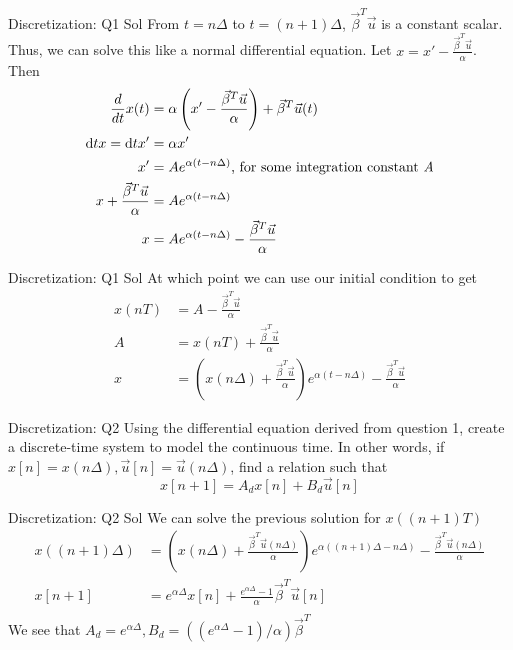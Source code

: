 \documentclass{beamer}
\begin{document}
\begin{frame}{Discretization: Q1 Sol}
From $t = n \Delta$ to $t = (n + 1) \Delta$, $\vec{\beta}^T \vec{u}$ is a constant scalar. Thus, we can solve this like a normal differential equation. Let $x = x' - \frac{\vec \beta^T \vec u}{\alpha}$. Then
\begin{align*}
\frac{d}{dt} x(t) &= \alpha \left(x' - \frac{\vec \beta^T \vec u}{\alpha}\right) + \vec{\beta}^T \vec u(t) \\
\mathrm d{t}x = \mathrm d{t}x' &= \alpha x' \\
x' &= A e^{\alpha (t - n \Delta)} \text{, for some integration constant \em{A}} \\
x + \frac{\vec \beta^T \vec u}{\alpha} &= A e^{\alpha (t - n \Delta)} \\
x &= A e^{\alpha (t - n \Delta)} - \frac{\vec \beta^T \vec u}{\alpha}
\end{align*}
\end{frame}
\begin{frame}{Discretization: Q1 Sol}
At which point we can use our initial condition to get
\begin{align*}
x(nT) &= A - \frac{\vec \beta^T \vec u}{\alpha} \\
A &= x(nT) + \frac{\vec \beta^T \vec u}{\alpha} \\
x &= \left( x(n \Delta) + \frac{\vec \beta^T \vec u}{\alpha} \right) e^{\alpha (t - n \Delta)} - \frac{\vec \beta^T \vec u}{\alpha}
\end{align*}
\end{frame}

\begin{frame}{Discretization: Q2}
Using the differential equation derived from question 1, create a discrete-time system to model the continuous time. In other words, if $x[n] = x(n \Delta), \vec{u}[n] = \vec{u}(n \Delta)$, find a relation such that
\[ x[n + 1] = A_d x[n] + B_d \vec{u}[n] \]
\end{frame}

\begin{frame}{Discretization: Q2 Sol}
We can solve the previous solution for $x((n + 1)T)$
\begin{align*}
x((n + 1) \Delta) &= \left( x(n \Delta) + \frac{\vec \beta^T \vec u(n \Delta)}{\alpha} \right) e^{\alpha ((n + 1)\Delta - n \Delta)} - \frac{\vec \beta^T \vec u(n \Delta)}{\alpha} \\
x[n + 1] &= e^{\alpha \Delta} x[n] + \frac{e^{\alpha \Delta} - 1}{\alpha} \vec{\beta}^T \vec{u}[n] \\
\end{align*}
We see that $A_d = e^{\alpha \Delta}, B_d = ((e^{\alpha \Delta} - 1) / \alpha) \vec{\beta}^T$
\end{frame}
\end{document}
